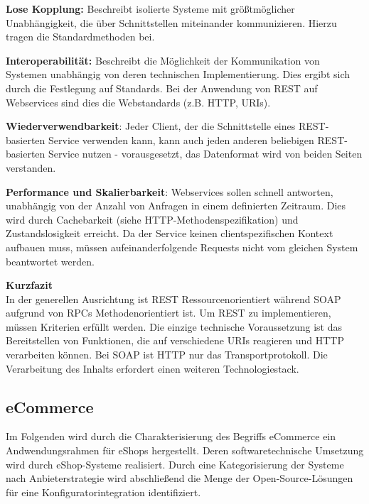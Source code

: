 \documentclass[12pt,a4paper,bibliography=totocnumbered,listof=totoc]{scrartcl}
\begin{document}
\begin{compactitem}
\item \textbf{Lose Kopplung:} Beschreibt isolierte Systeme mit größtmöglicher Unabhängigkeit, die über Schnittstellen miteinander kommunizieren. Hierzu tragen die Standardmethoden bei.
\item \textbf{Interoperabilität:} Beschreibt die Möglichkeit der Kommunikation von Systemen unabhängig von deren technischen Implementierung. Dies ergibt sich durch die Festlegung auf Standards. Bei der Anwendung von REST auf Webservices sind dies die Webstandards (z.B. HTTP, URIs).
\item \textbf{Wiederverwendbarkeit}: Jeder Client, der die Schnittstelle eines REST-basierten Service verwenden kann, kann auch jeden anderen beliebigen REST-basierten Service nutzen - vorausgesetzt, das Datenformat wird von beiden Seiten verstanden.
\item \textbf{Performance und Skalierbarkeit}: Webservices sollen schnell antworten, unabhängig von der Anzahl von Anfragen in einem definierten Zeitraum. Dies wird durch Cachebarkeit (siehe HTTP-Methodenspezifikation) und Zustandslosigkeit erreicht. Da der Service keinen clientspezifischen Kontext aufbauen muss, müssen aufeinanderfolgende Requests nicht vom gleichen System beantwortet werden.
\end{compactitem}
\pagebreak

\textbf{Kurzfazit}\\
In der generellen Ausrichtung ist REST Ressourcenorientiert während SOAP aufgrund von \ac{RPC}s Methodenorientiert ist. Um REST zu implementieren, müssen Kriterien erfüllt werden. Die einzige technische Voraussetzung ist das Bereitstellen von Funktionen, die auf verschiedene URIs reagieren und HTTP verarbeiten können. Bei SOAP ist HTTP nur das Transportprotokoll. Die Verarbeitung des Inhalts erfordert einen weiteren Technologiestack.

\subsection{eCommerce}

Im Folgenden wird durch die Charakterisierung des Begriffs eCommerce ein Andwendungsrahmen für eShops hergestellt. Deren softwaretechnische Umsetzung wird durch eShop-Systeme realisiert. Durch eine Kategorisierung der Systeme nach Anbieterstrategie wird abschließend die Menge der Open-Source-Lösungen für eine Konfiguratorintegration identifiziert.
\end{document}
